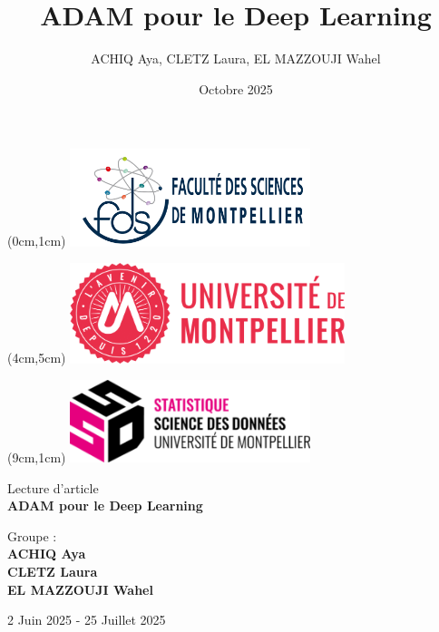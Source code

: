 \documentclass[a4paper,12pt]{article}
\title{ADAM pour le Deep Learning}
\author{ACHIQ Aya, CLETZ Laura, EL MAZZOUJI Wahel}
\date{Octobre 2025}
\begin{document}
\begin{textblock*}{3cm}(0cm,1cm)
    \includegraphics[width=7cm]{images/FdS.jpg}
\end{textblock*}

\begin{textblock*}{3cm}(4cm,5cm)
    \includegraphics[width=8cm]{images/UM.png}
\end{textblock*}

\begin{textblock*}{3cm}(9cm,1cm)
    \includegraphics[width=7cm]{images/SSD.png} 
\end{textblock*}

\vspace{9cm}
\begin{center}
\large{Lecture d'article}\\
\vspace{0.4cm}
{\LARGE \textbf{ADAM pour le Deep Learning}}\\[1cm]
\end{center}

\vfill
\begin{center}
Groupe : \\ 
\vspace{0.2cm}
{\textbf{ACHIQ Aya}}\\
\vspace{0.2cm}
{\textbf{CLETZ Laura}}\\ 
\vspace{0.2cm}
{\textbf{EL MAZZOUJI Wahel}}\\
\vspace{0.6cm}
    

{\large 2 Juin 2025 - 25 Juillet 2025}
\end{center}
\end{document}
